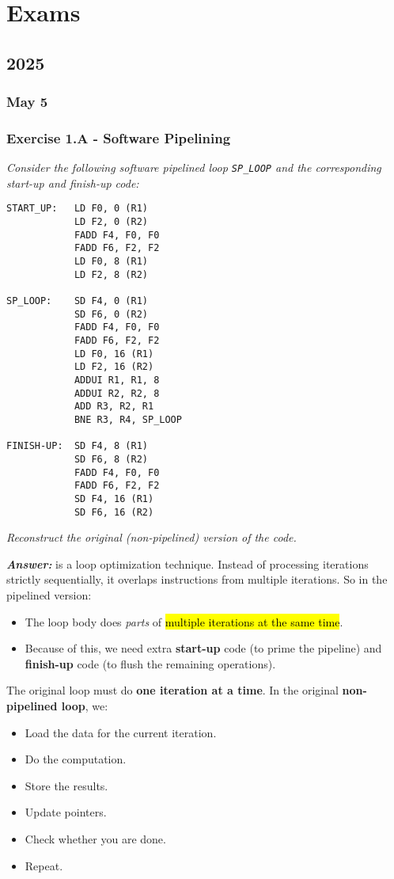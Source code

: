 \section{Exams}

\subsection{2025}

\subsubsection{May 5}

\subsubsection*{Exercise 1.A - Software Pipelining}

\emph{Consider the following software pipelined loop \texttt{SP\_LOOP} and the corresponding start-up and finish-up code:}
\begin{lstlisting}
START_UP:   LD F0, 0 (R1)
            LD F2, 0 (R2)
            FADD F4, F0, F0
            FADD F6, F2, F2
            LD F0, 8 (R1)
            LD F2, 8 (R2)

SP_LOOP:    SD F4, 0 (R1)
            SD F6, 0 (R2)
            FADD F4, F0, F0
            FADD F6, F2, F2
            LD F0, 16 (R1)
            LD F2, 16 (R2)
            ADDUI R1, R1, 8
            ADDUI R2, R2, 8
            ADD R3, R2, R1
            BNE R3, R4, SP_LOOP

FINISH-UP:  SD F4, 8 (R1)
            SD F6, 8 (R2)
            FADD F4, F0, F0
            FADD F6, F2, F2
            SD F4, 16 (R1)
            SD F6, 16 (R2)
\end{lstlisting}
\emph{Reconstruct the original (non-pipelined) version of the code.}

\highspace
\textcolor{Green3}{\textbf{\emph{Answer:}}}  is a loop optimization technique. Instead of processing iterations strictly sequentially, it overlaps instructions from multiple iterations. So in the pipelined version:
\begin{itemize}
    \item The loop body does \emph{parts} of \hl{multiple iterations at the same time}.
    \item Because of this, we need extra \textbf{start-up} code (to prime the pipeline) and \textbf{finish-up} code (to flush the remaining operations).
\end{itemize}
The original loop must do \textbf{one iteration at a time}. In the original \textbf{non-pipelined loop}, we:
\begin{itemize}
    \item Load the data for the current iteration.
    \item Do the computation.
    \item Store the results.
    \item Update pointers.
    \item Check whether you are done.
    \item Repeat.
\end{itemize}

